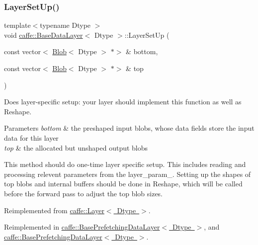 \subsubsection{\texorpdfstring{Layer\+Set\+Up()}{LayerSetUp()}\hspace{0.1cm}{\footnotesize\ttfamily [1/2]}}
{\footnotesize\ttfamily template$<$typename Dtype $>$ \\
void \mbox{\hyperlink{classcaffe_1_1_base_data_layer}{caffe\+::\+Base\+Data\+Layer}}$<$ Dtype $>$\+::Layer\+Set\+Up (\begin{DoxyParamCaption}\item[{const vector$<$ \mbox{\hyperlink{classcaffe_1_1_blob}{Blob}}$<$ Dtype $>$ $\ast$$>$ \&}]{bottom,  }\item[{const vector$<$ \mbox{\hyperlink{classcaffe_1_1_blob}{Blob}}$<$ Dtype $>$ $\ast$$>$ \&}]{top }\end{DoxyParamCaption})\hspace{0.3cm}{\ttfamily [virtual]}}



Does layer-\/specific setup\+: your layer should implement this function as well as Reshape. 


\begin{DoxyParams}{Parameters}
{\em bottom} & the preshaped input blobs, whose data fields store the input data for this layer \\
\hline
{\em top} & the allocated but unshaped output blobs\\
\hline
\end{DoxyParams}
This method should do one-\/time layer specific setup. This includes reading and processing relevent parameters from the {\ttfamily layer\+\_\+param\+\_\+}. Setting up the shapes of top blobs and internal buffers should be done in {\ttfamily Reshape}, which will be called before the forward pass to adjust the top blob sizes. 

Reimplemented from \mbox{\hyperlink{classcaffe_1_1_layer_a481323a3e0972c682787f2137468c29f}{caffe\+::\+Layer$<$ Dtype $>$}}.



Reimplemented in \mbox{\hyperlink{classcaffe_1_1_base_prefetching_data_layer_ad3b7914abaa6d46c148864c0e28204ad}{caffe\+::\+Base\+Prefetching\+Data\+Layer$<$ Dtype $>$}}, and \mbox{\hyperlink{classcaffe_1_1_base_prefetching_data_layer_ad3b7914abaa6d46c148864c0e28204ad}{caffe\+::\+Base\+Prefetching\+Data\+Layer$<$ Dtype $>$}}.

